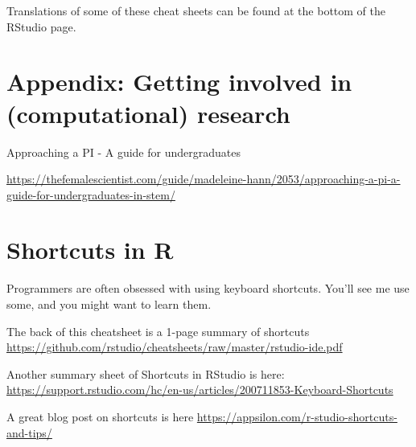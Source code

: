 \documentclass[
]{book}
\begin{document}
Translations of some of these cheat sheets can be found at the bottom of the RStudio page.

\hypertarget{appendix-getting-involved-in-computational-research}{%
\chapter{Appendix: Getting involved in (computational) research}\label{appendix-getting-involved-in-computational-research}}

Approaching a PI - A guide for undergraduates

\url{https://thefemalescientist.com/guide/madeleine-hann/2053/approaching-a-pi-a-guide-for-undergraduates-in-stem/}

\hypertarget{shortcuts-in-r}{%
\chapter{Shortcuts in R}\label{shortcuts-in-r}}

Programmers are often obsessed with using keyboard shortcuts. You'll see me use some, and you might want to learn them.

The back of this cheatsheet is a 1-page summary of shortcuts
\url{https://github.com/rstudio/cheatsheets/raw/master/rstudio-ide.pdf}

Another summary sheet of Shortcuts in RStudio is here:
\url{https://support.rstudio.com/hc/en-us/articles/200711853-Keyboard-Shortcuts}

A great blog post on shortcuts is here
\url{https://appsilon.com/r-studio-shortcuts-and-tips/}
\end{document}
